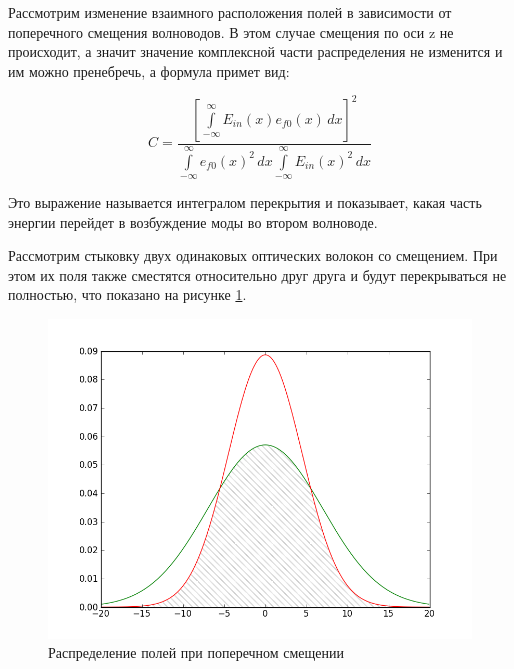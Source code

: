 Рассмотрим изменение взаимного расположения полей в зависимости от поперечного смещения волноводов. В этом случае смещения по оси z не происходит, а значит значение комплексной части распределения не изменится и им можно пренебречь, а формула примет вид:

\begin{equation}
	\label{coupling_natural}
	C = \frac{\left[\int\limits_{-\infty}^{\infty}E_{in}(x)e_{f0}(x) \,dx\right]^2}
	{\int\limits_{-\infty}^{\infty}e_{f0}(x)^2 \,dx
	 \int\limits_{-\infty}^{\infty}E_{in}(x)^2 \,dx}
\end{equation}

Это выражение называется интегралом перекрытия  и показывает, какая часть энергии перейдет в возбуждение моды во втором волноводе. 

Рассмотрим стыковку двух одинаковых оптических волокон со смещением. При этом их поля также сместятся относительно друг друга и будут перекрываться не полностью, что показано на рисунке \ref{intersection}.

\begin{figure}[h!]
	\includegraphics[width=.8\textwidth]{img/intersection.png}
	\caption{Распределение полей при поперечном смещении}
	\label{intersection}
\end{figure}

